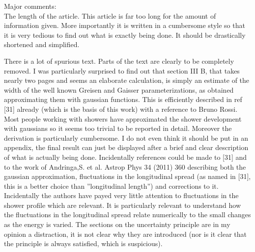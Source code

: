 \documentclass[12pt]{article}
\begin{document}
Major comments: \\

The length of the article. This article is far too long for the amount of information given. More importantly it is written in a cumbersome style so that it is very tedious to find out what is exactly being done. It should be drastically shortened and simplified.  

There is a lot of spurious text. Parts of the text are clearly to be completely removed. I was particularly surprised to find out that section III B, that takes nearly two pages and seems an elaborate
calculation, is simply an estimate of the width of the well known Greisen and Gaisser parameterizations, as obtained approximating them with gaussian functions. This is efficiently described in ref [31]
already (which is the basis of this work) with a reference to Bruno Rossi. Most people working with showers have approximated the shower development with gaussians so it seems too trivial to be reported in
detail. Moreover the derivation is particularly cumbersome. I do not even think it should be put in an appendix, the final result can just be displayed after a brief and clear description of what is actually
being done. Incidentally references could be made to [31] and to the work of Andringa,S. et al. Astrop Phys 34 (2011) 360 describing both the gaussian approximation, fluctuations in the longitudinal spread
(as named in [31], this is a better choice than ''longitudinal length'') and corrections to it. Incidentally the authors have payed very little attention to fluctuations in the shower profile which are relevant. It is particularly relevant to understand how the fluctuations in the longitudinal spread relate numerically to the small changes as the energy is varied. The sections on the uncertainty principle are in my opinion a distraction, it is not clear why they are introduced (nor is it clear that the principle is always satisfied, which is suspicious). 
\end{document}
